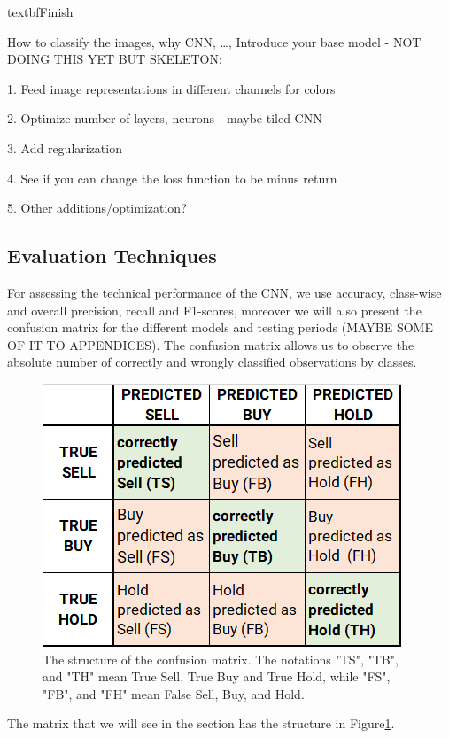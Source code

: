 \documentclass[11pt, a4paper]{article}
\begin{document}
textbf{Finish}


How to classify the images, why CNN, \dots, 
Introduce your base model - NOT DOING THIS YET BUT SKELETON:

1. Feed image representations in different channels for colors

2. Optimize number of layers, neurons - maybe tiled CNN

3. Add regularization

4. See if you can change the loss function to be minus return

5. Other additions/optimization?

\subsection{Evaluation Techniques}

For assessing the technical performance of the CNN, we use accuracy, class-wise and overall precision, recall and F1-scores, moreover we will also present the confusion matrix for the different models and testing periods (MAYBE SOME OF IT TO APPENDICES). 
The confusion matrix allows us to observe the absolute number of correctly and wrongly classified observations by classes. 
\begin{figure}[ht]
    \centering
    \includegraphics[width=\textwidth]{images/Confusion matrix.png}
    \caption{The structure of the confusion matrix. The notations "TS", "TB", and "TH" mean True Sell, True Buy and True Hold, while "FS", "FB", and "FH" mean False Sell, Buy, and Hold.}
    \label{fig:cmdef}
\end{figure}
The matrix that we will see in the section  has the structure in Figure\ref{fig:cmdef}.
\end{document}
